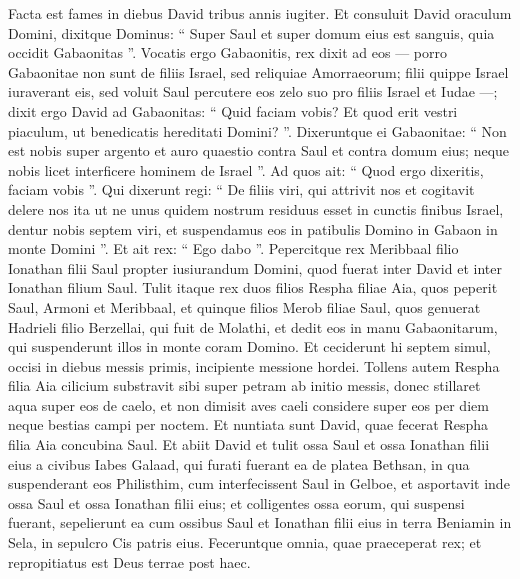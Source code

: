 \begin{biblechapter}
\begin{biblechapter}
\begin{biblechapter}
\begin{biblechapter}
\begin{biblechapter}
\begin{biblechapter}
\begin{biblechapter}
\begin{biblechapter}
\begin{biblechapter}
\begin{biblechapter}
\begin{biblechapter}
\begin{biblechapter}
\begin{biblechapter}
\begin{biblechapter}
\begin{biblechapter}
\begin{biblechapter}
\begin{biblechapter}
\begin{biblechapter}
\begin{biblechapter}
\begin{biblechapter}
\begin{biblechapter}
\verse Facta est fames in diebus David tribus annis iugiter. Et consuluit David oraculum Domini, dixitque Dominus: “ Super Saul et super domum eius est sanguis, quia occidit Gabaonitas ”. 
\verse Vocatis ergo Gabaonitis, rex dixit ad eos — porro Gabaonitae non sunt de filiis Israel, sed reliquiae Amorraeorum; filii quippe Israel iuraverant eis, sed voluit Saul percutere eos zelo suo pro filiis Israel et Iudae —; 
\verse dixit ergo David ad Gabaonitas: “ Quid faciam vobis? Et quod erit vestri piaculum, ut benedicatis hereditati Domini? ”. 
\verse Dixeruntque ei Gabaonitae: “ Non est nobis super argento et auro quaestio contra Saul et contra domum eius; neque nobis licet interficere hominem de Israel ”. Ad quos ait: “ Quod ergo dixeritis, faciam vobis ”. 
\verse Qui dixerunt regi: “ De filiis viri, qui attrivit nos et cogitavit delere nos ita ut ne unus quidem nostrum residuus esset in cunctis finibus Israel, 
\verse dentur nobis septem viri, et suspendamus eos in patibulis Domino in Gabaon in monte Domini ”. Et ait rex: “ Ego dabo ”.
 \verse Pepercitque rex Meribbaal filio Ionathan filii Saul propter iusiurandum Domini, quod fuerat inter David et inter Ionathan filium Saul. 
\verse Tulit itaque rex duos filios Respha filiae Aia, quos peperit Saul, Armoni et Meribbaal, et quinque filios Merob filiae Saul, quos genuerat Hadrieli filio Berzellai, qui fuit de Molathi, 
\verse et dedit eos in manu Gabaonitarum, qui suspenderunt illos in monte coram Domino. Et ceciderunt hi septem simul, occisi in diebus messis primis, incipiente messione hordei.
 \verse Tollens autem Respha filia Aia cilicium substravit sibi super petram ab initio messis, donec stillaret aqua super eos de caelo, et non dimisit aves caeli considere super eos per diem neque bestias campi per noctem.
 \verse Et nuntiata sunt David, quae fecerat Respha filia Aia concubina Saul. 
\verse Et abiit David et tulit ossa Saul et ossa Ionathan filii eius a civibus Iabes Galaad, qui furati fuerant ea de platea Bethsan, in qua suspenderant eos Philisthim, cum interfecissent Saul in Gelboe, 
\verse et asportavit inde ossa Saul et ossa Ionathan filii eius; et colligentes ossa eorum, qui suspensi fuerant, 
\verse sepelierunt ea cum ossibus Saul et Ionathan filii eius in terra Beniamin in Sela, in sepulcro Cis patris eius. Feceruntque omnia, quae praeceperat rex; et repropitiatus est Deus terrae post haec.

\end{biblechapter}
\end{biblechapter}
\end{biblechapter}
\end{biblechapter}
\end{biblechapter}
\end{biblechapter}
\end{biblechapter}
\end{biblechapter}
\end{biblechapter}
\end{biblechapter}
\end{biblechapter}
\end{biblechapter}
\end{biblechapter}
\end{biblechapter}
\end{biblechapter}
\end{biblechapter}
\end{biblechapter}
\end{biblechapter}
\end{biblechapter}
\end{biblechapter}
\end{biblechapter}

